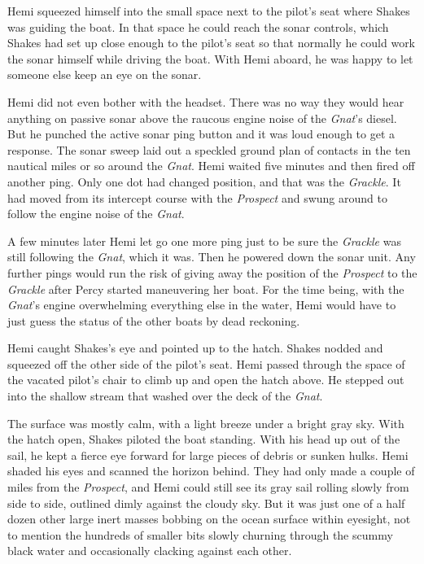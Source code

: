 \documentclass[
]{scrbook}
\begin{document}
Hemi squeezed himself into the small space next to the pilot's seat
where Shakes was guiding the boat. In that space he could reach the
sonar controls, which Shakes had set up close enough to the pilot's seat
so that normally he could work the sonar himself while driving the boat.
With Hemi aboard, he was happy to let someone else keep an eye on the
sonar.

Hemi did not even bother with the headset. There was no way they would
hear anything on passive sonar above the raucous engine noise of the
\emph{Gnat}'s diesel. But he punched the active sonar ping button and it
was loud enough to get a response. The sonar sweep laid out a speckled
ground plan of contacts in the ten nautical miles or so around the
\emph{Gnat}. Hemi waited five minutes and then fired off another ping.
Only one dot had changed position, and that was the \emph{Grackle}. It
had moved from its intercept course with the \emph{Prospect} and swung
around to follow the engine noise of the \emph{Gnat}.

A few minutes later Hemi let go one more ping just to be sure the
\emph{Grackle} was still following the \emph{Gnat}, which it was. Then
he powered down the sonar unit. Any further pings would run the risk of
giving away the position of the \emph{Prospect} to the \emph{Grackle}
after Percy started maneuvering her boat. For the time being, with the
\emph{Gnat}'s engine overwhelming everything else in the water, Hemi
would have to just guess the status of the other boats by dead
reckoning.

Hemi caught Shakes's eye and pointed up to the hatch. Shakes nodded and
squeezed off the other side of the pilot's seat. Hemi passed through the
space of the vacated pilot's chair to climb up and open the hatch above.
He stepped out into the shallow stream that washed over the deck of the
\emph{Gnat}.

The surface was mostly calm, with a light breeze under a bright gray
sky. With the hatch open, Shakes piloted the boat standing. With his
head up out of the sail, he kept a fierce eye forward for large pieces
of debris or sunken hulks. Hemi shaded his eyes and scanned the horizon
behind. They had only made a couple of miles from the \emph{Prospect},
and Hemi could still see its gray sail rolling slowly from side to side,
outlined dimly against the cloudy sky. But it was just one of a half
dozen other large inert masses bobbing on the ocean surface within
eyesight, not to mention the hundreds of smaller bits slowly churning
through the scummy black water and occasionally clacking against each
other.
\end{document}

